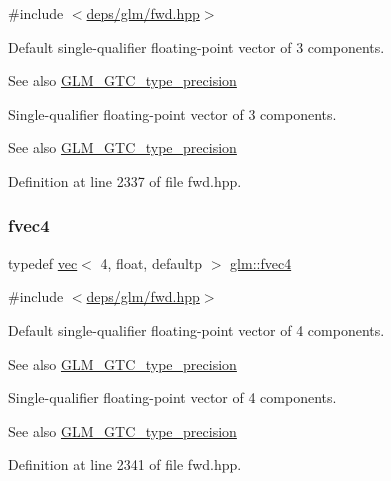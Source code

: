 {\ttfamily \#include $<$\hyperlink{fwd_8hpp}{deps/glm/fwd.\+hpp}$>$}

Default single-\/qualifier floating-\/point vector of 3 components. \begin{DoxySeeAlso}{See also}
\hyperlink{group__gtc__type__precision}{G\+L\+M\+\_\+\+G\+T\+C\+\_\+type\+\_\+precision}
\end{DoxySeeAlso}
Single-\/qualifier floating-\/point vector of 3 components. \begin{DoxySeeAlso}{See also}
\hyperlink{group__gtc__type__precision}{G\+L\+M\+\_\+\+G\+T\+C\+\_\+type\+\_\+precision} 
\end{DoxySeeAlso}


Definition at line 2337 of file fwd.\+hpp.

\mbox{\label{group__gtc__type__precision_ga0319cdd208269c180e326b243e2e84e4}} 
\subsubsection{\texorpdfstring{fvec4}{fvec4}}
{\footnotesize\ttfamily typedef \hyperlink{structglm_1_1vec}{vec}$<$ 4, float, defaultp $>$ \hyperlink{group__gtc__type__precision_ga0319cdd208269c180e326b243e2e84e4}{glm\+::fvec4}}



{\ttfamily \#include $<$\hyperlink{fwd_8hpp}{deps/glm/fwd.\+hpp}$>$}

Default single-\/qualifier floating-\/point vector of 4 components. \begin{DoxySeeAlso}{See also}
\hyperlink{group__gtc__type__precision}{G\+L\+M\+\_\+\+G\+T\+C\+\_\+type\+\_\+precision}
\end{DoxySeeAlso}
Single-\/qualifier floating-\/point vector of 4 components. \begin{DoxySeeAlso}{See also}
\hyperlink{group__gtc__type__precision}{G\+L\+M\+\_\+\+G\+T\+C\+\_\+type\+\_\+precision} 
\end{DoxySeeAlso}


Definition at line 2341 of file fwd.\+hpp.

\mbox{\label{group__gtc__type__precision_gaa04399853952dbce29cb62e2432f350a}} 
